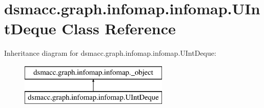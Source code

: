 \hypertarget{classdsmacc_1_1graph_1_1infomap_1_1infomap_1_1UIntDeque}{}\section{dsmacc.\+graph.\+infomap.\+infomap.\+U\+Int\+Deque Class Reference}
\label{classdsmacc_1_1graph_1_1infomap_1_1infomap_1_1UIntDeque}
Inheritance diagram for dsmacc.\+graph.\+infomap.\+infomap.\+U\+Int\+Deque\+:\begin{figure}[H]
\begin{center}
\leavevmode
\includegraphics[height=2.000000cm]{classdsmacc_1_1graph_1_1infomap_1_1infomap_1_1UIntDeque}
\end{center}
\end{figure}
